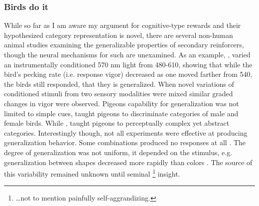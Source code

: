 \documentclass[doc,12pt]{apa}        %
\begin{document}
\subsubsection{Birds do it}
\label{sub:var_val}
While so far as I am aware my argument for cognitive-type rewards and their hypothesized category representation is novel, there are several non-human animal studies examining the generalizable properties of secondary reinforcers, though the neural mechanisms for such are unexamined.  As an example, , varied an instrumentally conditioned 570 nm light from 480-610, showing that while the bird's pecking rate (i.e. response vigor) decreased as one moved farther from 540, the birds still responded, that they is generalized.  When novel variations of conditioned stimuli from two sensory modalities were mixed similar graded changes in vigor were observed.  Pigeons capability for generalization was not limited to simple cues, \cite{Nakamura:2006p9093} taught pigeons to discriminate categories of male and female birds.  While , taught pigeons to perceptually complex yet abstract categories.  Interestingly though, not all experiments were effective at producing generalization behavior.  Some combinations produced no responses at all \cite{Blough:2001p8408,Simmons:2008p8405,Urcuioli:2001p8359}.  The degree of generalization was not uniform, it depended on the stimulus, e.g. generalization between shapes decreased more rapidly than colors .  The source of this variability remained unknown until  seminal 
\footnote{
    \dots not to mention painfully self-aggrandizing.
} insight.
\end{document}

